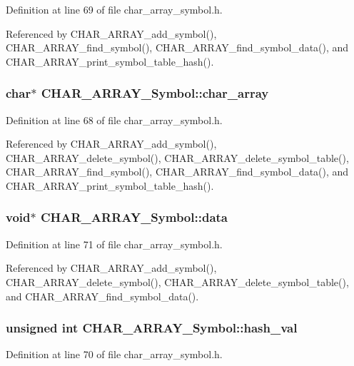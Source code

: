 Definition at line 69 of file char\_\-array\_\-symbol.h.

Referenced by CHAR\_\-ARRAY\_\-add\_\-symbol(), CHAR\_\-ARRAY\_\-find\_\-symbol(), CHAR\_\-ARRAY\_\-find\_\-symbol\_\-data(), and CHAR\_\-ARRAY\_\-print\_\-symbol\_\-table\_\-hash().
\subsubsection{\setlength{\rightskip}{0pt plus 5cm}char$\ast$ \bf{CHAR\_\-ARRAY\_\-Symbol::char\_\-array}}\label{structCHAR__ARRAY__Symbol_08431e8dedd5f7ea9e390e4229dc3ebd}




Definition at line 68 of file char\_\-array\_\-symbol.h.

Referenced by CHAR\_\-ARRAY\_\-add\_\-symbol(), CHAR\_\-ARRAY\_\-delete\_\-symbol(), CHAR\_\-ARRAY\_\-delete\_\-symbol\_\-table(), CHAR\_\-ARRAY\_\-find\_\-symbol(), CHAR\_\-ARRAY\_\-find\_\-symbol\_\-data(), and CHAR\_\-ARRAY\_\-print\_\-symbol\_\-table\_\-hash().
\subsubsection{\setlength{\rightskip}{0pt plus 5cm}void$\ast$ \bf{CHAR\_\-ARRAY\_\-Symbol::data}}\label{structCHAR__ARRAY__Symbol_d311443b86b3a961cf98352157c6414b}




Definition at line 71 of file char\_\-array\_\-symbol.h.

Referenced by CHAR\_\-ARRAY\_\-add\_\-symbol(), CHAR\_\-ARRAY\_\-delete\_\-symbol(), CHAR\_\-ARRAY\_\-delete\_\-symbol\_\-table(), and CHAR\_\-ARRAY\_\-find\_\-symbol\_\-data().
\subsubsection{\setlength{\rightskip}{0pt plus 5cm}unsigned int \bf{CHAR\_\-ARRAY\_\-Symbol::hash\_\-val}}\label{structCHAR__ARRAY__Symbol_2b38160af17fdece6803fea7bce25044}




Definition at line 70 of file char\_\-array\_\-symbol.h.

